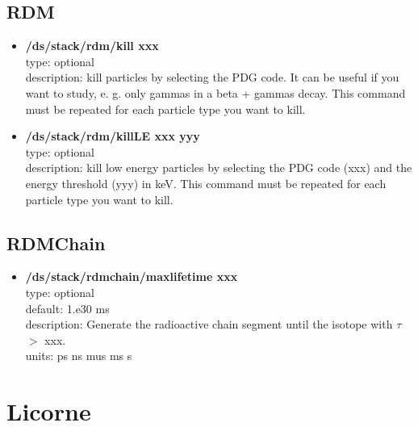 \documentclass[twocolumn, 10pt]{article}
\begin{document}
\subsection{RDM}

\begin{itemize}
\item \textbf{ /ds/stack/rdm/kill  xxx}\\
type: optional \\
description: kill particles by selecting the PDG code. It can be useful if you want to study, e. g. only
gammas in a beta + gammas decay. This command must be repeated for each particle type you want to kill.\\

\item \textbf{ /ds/stack/rdm/killLE  xxx yyy}\\
type: optional \\
description: kill low energy particles by selecting the PDG code (xxx) and the energy threshold  (yyy) in keV. 
This command must be repeated for each particle type you want to kill.\\

\end{itemize}


\subsection{RDMChain}

\begin{itemize}
\item \textbf{ /ds/stack/rdmchain/maxlifetime  xxx}\\
type: optional \\
default: 1.e30 ms \\
description: Generate the radioactive chain segment until the isotope with  $\tau$ $>$ xxx. \\
units: ps ns mus ms s \\


\end{itemize}

\section{Licorne}
\end{document}
